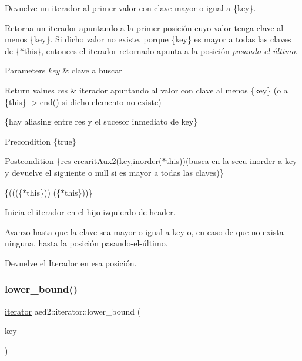 Devuelve un iterador al primer valor con clave mayor o igual a \{key\}. 

Retorna un iterador apuntando a la primer posición cuyo valor tenga clave al menos \{key\}. Si dicho valor no existe, porque \{key\} es mayor a todas las claves de \{$\ast$this\}, entonces el iterador retornado apunta a la posición {\itshape pasando-\/el-\/último}.


\begin{DoxyParams}{Parameters}
{\em key} & clave a buscar \\
\hline
\end{DoxyParams}

\begin{DoxyRetVals}{Return values}
{\em res} & iterador apuntando al valor con clave al menos \{key\} (o a \{this\}-\/$>$\hyperlink{classaed2_1_1iterator_a67caf9468be999e9be96b7add5d79946}{end()} si dicho elemento no existe)\\
\hline
\end{DoxyRetVals}
\{hay aliasing entre res y el sucesor inmediato de key\}

\begin{DoxyPrecond}{Precondition}
\{true\} 
\end{DoxyPrecond}
\begin{DoxyPostcond}{Postcondition}
\{res  crearit\+Aux2(key,inorder($\ast$this))(busca en la secu inorder a key y devuelve el siguiente o null si es mayor a todas las claves)\}
\end{DoxyPostcond}
\{(((\{$\ast$this\}))  (\{$\ast$this\}))\}
\begin{DoxyItemize}
\item Inicia el iterador en el hijo izquierdo de header.
\item Avanzo hasta que la clave sea mayor o igual a key o, en caso de que no exista ninguna, hasta la posición pasando-\/el-\/último.
\item Devuelve el Iterador en esa posición. 
\end{DoxyItemize}\mbox{\label{classaed2_1_1iterator_ac48bbb54fea69c1fb4c093eecda02c5a}} 
\subsubsection{\texorpdfstring{lower\+\_\+bound()}{lower\_bound()}\hspace{0.1cm}{\footnotesize\ttfamily [2/2]}}
{\footnotesize\ttfamily \hyperlink{classaed2_1_1iterator_1_1iterator}{iterator} aed2\+::iterator\+::lower\+\_\+bound (\begin{DoxyParamCaption}\item[{const Key \&}]{key }\end{DoxyParamCaption})\hspace{0.3cm}{\ttfamily [inline]}}

